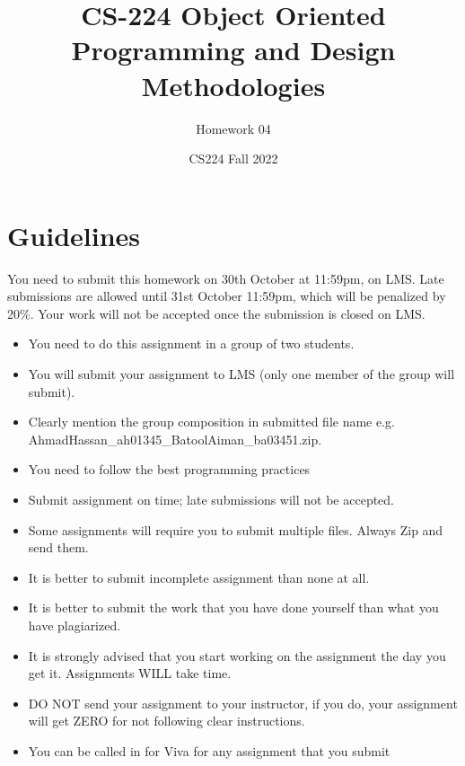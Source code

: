 \documentclass[a4paper,12pt]{article}
\begin{document}
	
	\title{CS-224 Object Oriented Programming and Design Methodologies }
	\author{Homework 04}
	\date{CS224 Fall 2022}
	\maketitle
	\section{Guidelines}
	
	You need to submit this homework on  {\color{blue}30th October at 11:59pm}, on LMS. Late submissions are allowed until {\color{red} 31st October 11:59pm}, which will be penalized by 20\%. Your work will not be accepted once the submission is closed on LMS.

	
	\begin{itemize}
		\item You need to do this assignment in a group of two students.
		\item You will submit your assignment to LMS (only one member of the group will submit).
		\item Clearly mention the group composition in submitted file name e.g. AhmadHassan\_ah01345\_BatoolAiman\_ba03451.zip. 
		\item You need to follow the best programming practices 
		\item Submit assignment on time; late submissions will not be accepted.
		\item Some assignments will require you to submit multiple files. Always Zip and send them.
		\item It is better to submit incomplete assignment than none at all.
		\item It is better to submit the work that you have done yourself than what you have plagiarized.
		\item It is strongly advised that you start working on the assignment the day you get it. Assignments WILL take time.
		\item DO NOT send your assignment to your instructor, if you do, your assignment will get ZERO for not following clear instructions.
		\item You can be called in for Viva for any assignment that you submit
	\end{itemize}
	
\end{document}
